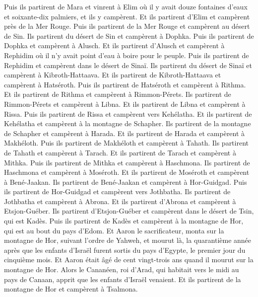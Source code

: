 \begin{multicols}{2}
Puis ils partirent de Mara et vinrent à Elim où il y avait douze fontaines d'eaux et soixante-dix palmiers, et ils y campèrent.
Et ils partirent d'Elim et campèrent près de la Mer Rouge.
Puis ils partirent de la Mer Rouge et campèrent au désert de Sin.
Ils partirent du désert de Sin et campèrent à Dophka.
Puis ils partirent de Dophka et campèrent à Alusch.
Et ils partirent d'Alusch et campèrent à Rephidim où il n'y avait point d'eau à boire pour le peuple.
Puis ils partirent de Rephidim et campèrent dans le désert de Sinaï.
Ils partirent du désert de Sinaï et campèrent à Kibroth-Hattaava.
Et ils partirent de Kibroth-Hattaava et campèrent à Hatséroth.
Puis ils partirent de Hatséroth et campèrent à Rithma.
Et ils partirent de Rithma et campèrent à Rimmon-Pérets.
Ils partirent de Rimmon-Pérets et campèrent à Libna.
Et ils partirent de Libna et campèrent à Rissa.
Puis ils partirent de Rissa et campèrent vers Kehélatha.
Et ils partirent de Kehélatha et campèrent à la montagne de Schapher.
Ils partirent de la montagne de Schapher et campèrent à Harada.
Et ils partirent de Harada et campèrent à Makhéloth.
Puis ils partirent de Makhéloth et campèrent à Tahath.
Ils partirent de Tahath et campèrent à Tarach.
Et ils partirent de Tarach et campèrent à Mithka.
Puis ils partirent de Mithka et campèrent à Haschmona.
Ils partirent de Haschmona et campèrent à Moséroth.
Et ils partirent de Moséroth et campèrent à Bené-Jaakan.
Ils partirent de Bené-Jaakan et campèrent à Hor-Guidgad.
Puis ils partirent de Hor-Guidgad et campèrent vers Jothbatha.
Ils partirent de Jothbatha et campèrent à Abrona.
Et ils partirent d'Abrona et campèrent à Etsjon-Guéber.
Ils partirent d'Etsjon-Guéber et campèrent dans le désert de Tsin, qui est Kadès.
Puis ils partirent de Kadès et campèrent à la montagne de Hor, qui est au bout du pays d'Edom.
Et Aaron le sacrificateur, monta sur la montagne de Hor, suivant l'ordre de Yahweh, et mourut là, la quarantième année après que les enfants d'Israël furent sortis du pays d'Egypte, le premier jour du cinquième mois.
Et Aaron était âgé de cent vingt-trois ans quand il mourut sur la montagne de Hor.
Alors le Cananéen, roi d'Arad, qui habitait vers le midi au pays de Canaan, apprit que les enfants d'Israël venaient.
Et ils partirent de la montagne de Hor et campèrent à Tsalmona.

\end{multicols}
